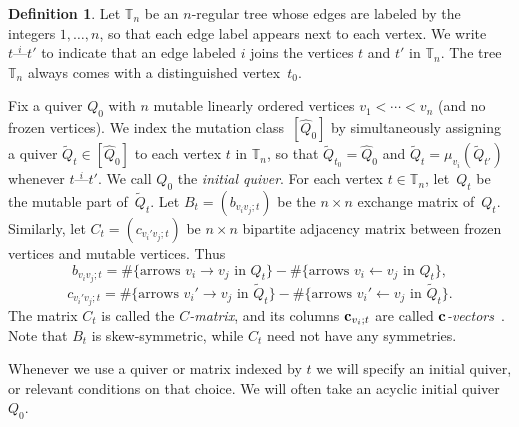 \documentclass[11pt, letterpaper]{amsart}
\theoremstyle{definition}
\newtheorem{definition}[theorem]{Definition}
\numberwithin{equation}{section}
\begin{document}
\begin{definition}
\label{def:indexing}
Let $\mathbb{T}_n$ be an $n$-regular tree whose edges are labeled by the integers $1, \ldots, n$, so that each edge label appears next to each vertex.
We write $t \stackrel{i}{\text{---}} t'$ to indicate that an edge labeled $i$ joins the vertices $t$ and $t'$ in $\mathbb{T}_n$.
The tree $\mathbb{T}_n$ always comes with a distinguished vertex~$t_0$. 

Fix a quiver $Q_0$ with $n$ mutable linearly ordered vertices $v_1 <  \cdots < v_n$ (and no frozen vertices).
We index the mutation class~$[\widehat Q_0]$ by simultaneously assigning a quiver $\tilde Q_t \in [\widehat Q_0]$ 
to each vertex $t$ in $\mathbb{T}_n$, so that $\tilde Q_{t_0}=\widehat Q_0$
and $\tilde Q_t = \mu_{v_i}(\tilde Q_{t'})$ whenever $t \stackrel{i}{\text{---}} t'$.
We call $Q_0$ the \emph{initial quiver}. 
For each vertex $t \in \mathbb T_n$, let~$Q_t$ be the mutable part of~$\tilde Q_t$.
Let $B_t = (b_{v_i v_j; t})$ be the $n \times n$ exchange matrix of~$Q_t$.
Similarly, let $C_t = (c_{v_i' v_j;t})$ be $n \times n$ bipartite adjacency matrix between frozen vertices and mutable vertices. 
Thus
$$b_{v_iv_j;t} = \#\{ \text{arrows } v_i \rightarrow v_j \text{ in } Q_t\} - \#\{ \text{arrows } v_i \leftarrow v_j  \text{ in } Q_t\},$$
$$c_{v_i'v_j;t} = \#\{ \text{arrows } v_i'\rightarrow v_j  \text{ in } \tilde Q_t\} - \#\{ \text{arrows } v_i' \leftarrow v_j  \text{ in } \tilde Q_t\}.$$
The matrix $C_t$ is called the \emph{$C$-matrix}, and its columns $\bold c_{v_i;t}$ are called \emph{$\bold c$-vectors}~\cite{Nakanishi-Zelevinsky}.
Note that $B_t$ is skew-symmetric, while $C_t$ need not have any symmetries.

Whenever we use a quiver or matrix indexed by $t$ we will specify an initial quiver, or relevant conditions on that choice.
We will often take an acyclic initial quiver $Q_0$. 
\end{definition}
\end{document}
